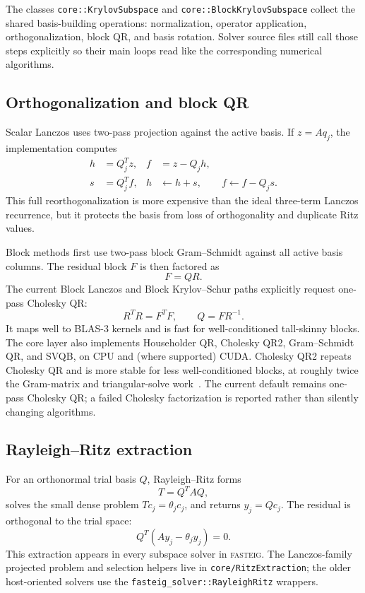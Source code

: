 \documentclass[11pt]{article}
\newcommand{\fasteig}{\textsc{fasteig}}
\newcommand{\code}[1]{\texttt{#1}}
\begin{document}
The classes \code{core::KrylovSubspace} and
\code{core::BlockKrylovSubspace} collect the shared basis-building operations:
normalization, operator application, orthogonalization, block QR, and basis
rotation.  Solver source files still call those steps explicitly so their main
loops read like the corresponding numerical algorithms.

\subsection{Orthogonalization and block QR}

Scalar Lanczos uses two-pass projection against the active basis.  If $z=Aq_j$,
the implementation computes
\begin{align}
  h &= Q_j^T z,            & f &= z-Q_jh,\\
  s &= Q_j^T f,            & h &\leftarrow h+s,\qquad f\leftarrow f-Q_js.
\end{align}
This full reorthogonalization is more expensive than the ideal three-term
Lanczos recurrence, but it protects the basis from loss of orthogonality and
duplicate Ritz values.

Block methods first use two-pass block Gram--Schmidt against all active basis
columns.  The residual block $F$ is then factored as
\begin{equation}
  F=QR.
\end{equation}
The current Block Lanczos and Block Krylov--Schur paths explicitly request
one-pass Cholesky QR:
\begin{equation}
  R^TR=F^TF, \qquad Q=FR^{-1}.
\end{equation}
It maps well to BLAS-3 kernels and is fast for well-conditioned tall-skinny
blocks.  The core layer also implements Householder QR, Cholesky QR2,
Gram--Schmidt QR, and SVQB, on CPU and (where supported) CUDA.  Cholesky QR2
repeats Cholesky QR and is more stable for less well-conditioned blocks, at
roughly twice the Gram-matrix and triangular-solve work~\cite{shiftedcholqr}.
The current default remains one-pass Cholesky QR; a failed Cholesky factorization
is reported rather than silently changing algorithms.

\subsection{Rayleigh--Ritz extraction}

For an orthonormal trial basis $Q$, Rayleigh--Ritz forms
\begin{equation}
  T=Q^TAQ,
\end{equation}
solves the small dense problem $Tc_j=\theta_j c_j$, and returns
$y_j=Qc_j$.  The residual is orthogonal to the trial space:
\begin{equation}
  Q^T(Ay_j-\theta_jy_j)=0.
\end{equation}
This extraction appears in every subspace solver in \fasteig{}.  The
Lanczos-family projected problem and selection helpers live in
\code{core/RitzExtraction}; the older host-oriented solvers use the
\code{fasteig\_solver::RayleighRitz} wrappers.
\end{document}
